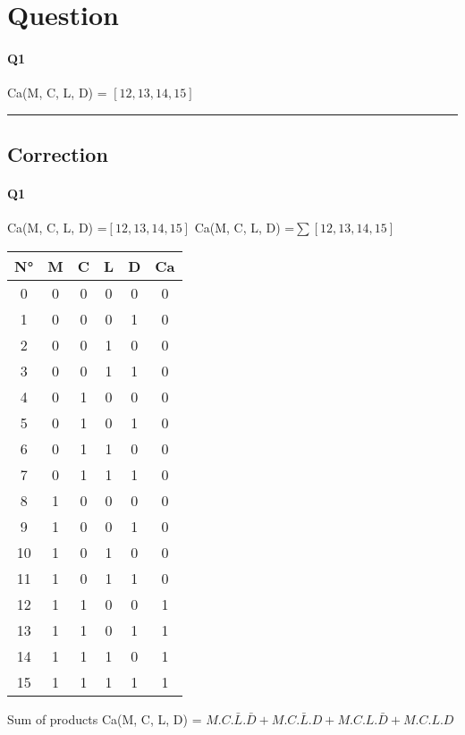 
\section{Question}

\paragraph{Q1}


Ca(M, C, L, D) = $[12, 13, 14, 15]$

\hrule width 1\linewidth\pagebreak
\subsection{Correction}

\paragraph{Q1}

Ca(M, C, L, D) =$[12, 13, 14, 15]$
Ca(M, C, L, D) =$ \sum [12, 13, 14, 15] $ 

        \begin{tabular}{|c|c|c|c|c||c|}
    \toprule
        N° & M & C & L & D & Ca\\ \midrule0 & 0 & 0 & 0 & 0 & 0\\1 & 0 & 0 & 0 & 1 & 0\\2 & 0 & 0 & 1 & 0 & 0\\3 & 0 & 0 & 1 & 1 & 0\\\midrule4 & 0 & 1 & 0 & 0 & 0\\5 & 0 & 1 & 0 & 1 & 0\\6 & 0 & 1 & 1 & 0 & 0\\7 & 0 & 1 & 1 & 1 & 0\\\midrule8 & 1 & 0 & 0 & 0 & 0\\9 & 1 & 0 & 0 & 1 & 0\\10 & 1 & 0 & 1 & 0 & 0\\11 & 1 & 0 & 1 & 1 & 0\\\midrule12 & 1 & 1 & 0 & 0 & 1\\13 & 1 & 1 & 0 & 1 & 1\\14 & 1 & 1 & 1 & 0 & 1\\15 & 1 & 1 & 1 & 1 & 1\\\bottomrule
        \end{tabular}
        
Sum of products 
 Ca(M, C, L, D) = $M.C.\bar L.\bar D + M.C.\bar L.D + M.C.L.\bar D + M.C.L.D$


